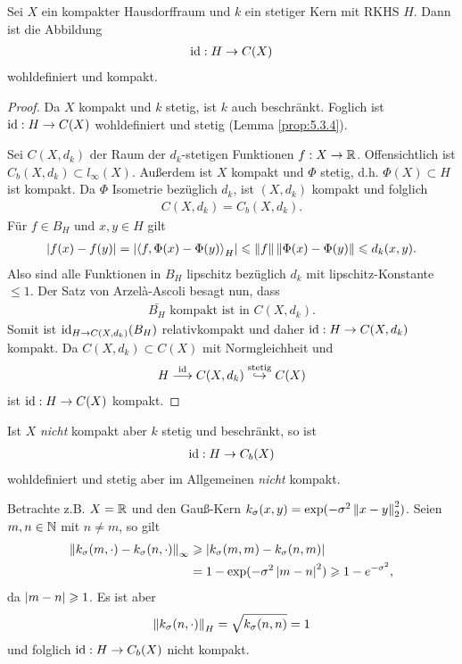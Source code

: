 \begin{prop}
\label{prop:5.3.7}
Sei $X$ ein kompakter Hausdorffraum und $k$ ein stetiger Kern mit RKHS $H$. Dann
ist die Abbildung
\begin{align*}
\operatorname{id} : H\to C(X)
\end{align*}
wohldefiniert und kompakt.\fishhere
\end{prop}
\begin{proof}
Da $X$ kompakt und $k$ stetig, ist $k$ auch beschränkt. Foglich ist $\operatorname{id} :H\to
C(X)$ wohldefiniert und stetig (Lemma \ref{prop:5.3.4}).

Sei $C(X,d_k)$ der Raum der $d_k$-stetigen Funktionen $f: X\to \mathbb{R}$.
Offensichtlich ist $C_b(X,d_k)\subset l_\infty(X)$. Außerdem ist
$X$  kompakt und $\Phi$ stetig, d.h. $\Phi(X)\subset H$ ist kompakt. Da
$\Phi$ Isometrie bezüglich $d_k$, ist $(X,d_k)$ kompakt und folglich
\begin{align*}
C(X,d_k) = C_b(X,d_k).
\end{align*} 
Für $f\in B_H$ und $x,y\in H$ gilt
\begin{align*}
\left|f(x)-f(y)\right| = \left|\left\langle f,\Phi(x)-\Phi(y)\right\rangle_H\right|
\leqslant \left\|f\right\|\left\|\Phi(x)-\Phi(y)\right\|
\leqslant d_k(x,y).
\end{align*}
Also sind alle Funktionen in $B_H$ lipschitz bezüglich $d_k$ mit
lipschitz-Konstante $\le 1$. Der Satz von Arzelà-Ascoli besagt nun, dass
\begin{align*}
\bar{B_H} \text{ kompakt ist in } C(X,d_k).
\end{align*}
Somit ist $\operatorname{id}_{H\to C(X,d_k)}(B_H)$ relativkompakt und daher $\operatorname{id}: H\to
C(X,d_k)$ kompakt. Da $C(X,d_k)\subset C(X)$ mit Normgleichheit und
\begin{align*}
H \overset{\operatorname{id}}{\longrightarrow} C(X,d_k)
\overset{\text{stetig}}{\hookrightarrow} C(X)
\end{align*}
ist $\operatorname{id}: H\to C(X)$ kompakt.\qedhere
\end{proof}

\begin{bem*}
Ist $X$ \textit{nicht} kompakt aber $k$ stetig und beschränkt, so ist
\begin{align*}
\operatorname{id}: H\to C_b(X)
\end{align*}
wohldefiniert und stetig aber im Allgemeinen \textit{nicht} kompakt.

Betrachte z.B. $X=\mathbb{R}$ und den Gauß-Kern $k_\sigma(x,y) =
\exp(-\sigma^2\left\|x-y\right\|_2^2)$. Seien $m,n\in\mathbb{N}$ mit $n\neq m$, so gilt
\begin{align*}
\left\|k_\sigma(m,\cdot)-k_\sigma(n,\cdot)\right\|_\infty
&\geqslant
\left|k_\sigma(m,m)-k_\sigma(n,m)\right|\\
&= 1- \exp(-\sigma^2\left|m-n\right|^2) \geqslant 1-e^{-\sigma^2},
\end{align*}
da $\left|m-n\right| \geqslant 1$. Es ist aber
\begin{align*}
\left\|k_\sigma(n,\cdot)\right\|_H = \sqrt{k_\sigma(n,n)} = 1
\end{align*}
und folglich $\operatorname{id}: H\to C_b(X)$ nicht kompakt.\maphere
\end{bem*}

